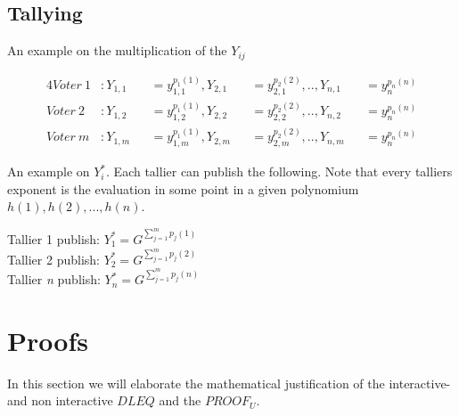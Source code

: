 \subsection{Tallying}
An example on the multiplication of the $Y_{ij}$

\begin{alignat*}{4}
Voter \ 1&: Y_{1,1}&&=y_{1,1}^{p_1(1)},Y_{2,1}&&=y_{2,1}^{p_2(2)} ,.., Y_{n,1}&&=y_n^{p_n(n)}\\
Voter \ 2&: Y_{1,2}&&=y_{1,2}^{p_1(1)},Y_{2,2}&&=y_{2,2}^{p_2(2)} ,.., Y_{n,2}&&=y_n^{p_n(n)}\\
Voter \ \textit{m}&: Y_{1,m}&&=y_{1,m}^{p_1(1)} , Y_{2,m}&&=y_{2,m}^{p_2(2)} ,.., Y_{n,m}&&=y_n^{p_n(n)}
\end{alignat*}


\noindent
An example on $Y_i^*$. Each tallier can publish the following. Note that every talliers exponent is the evaluation in some point in a given polynomium \begin{math}h(1), h(2),..., h(n) \end{math}.
\begin{center}
Tallier 1 publish: \begin{math}Y_1^* = G^{ \sum\limits_{j=1}^m p_j(1)}   \end{math}\\
Tallier 2 publish: \begin{math}Y_2^* = G^{ \sum\limits_{j=1}^m p_j(2)}   \end{math}\\
Tallier \textit{n} publish: \begin{math}Y_n^* = G^{ \sum\limits_{j=1}^m p_j(n)}  \end{math}\\
\end{center}



\section{Proofs}
In this section we will elaborate the mathematical justification of the interactive- and non interactive $DLEQ$ and the $PROOF_U$. 

